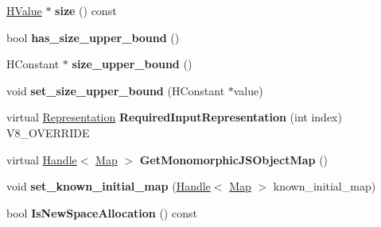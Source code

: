 \begin{DoxyCompactItemize}
\item 
\hypertarget{classv8_1_1internal_1_1_v8___f_i_n_a_l_a71e63fd05d13c130928b572c6955f1fd}{}\hyperlink{classv8_1_1internal_1_1_h_value}{H\+Value} $\ast$ {\bfseries size} () const \label{classv8_1_1internal_1_1_v8___f_i_n_a_l_a71e63fd05d13c130928b572c6955f1fd}

\item 
\hypertarget{classv8_1_1internal_1_1_v8___f_i_n_a_l_a988a0430d0c63125e30ded201e5c899c}{}bool {\bfseries has\+\_\+size\+\_\+upper\+\_\+bound} ()\label{classv8_1_1internal_1_1_v8___f_i_n_a_l_a988a0430d0c63125e30ded201e5c899c}

\item 
\hypertarget{classv8_1_1internal_1_1_v8___f_i_n_a_l_ac819ec6ceac822f5c24d97f917353579}{}H\+Constant $\ast$ {\bfseries size\+\_\+upper\+\_\+bound} ()\label{classv8_1_1internal_1_1_v8___f_i_n_a_l_ac819ec6ceac822f5c24d97f917353579}

\item 
\hypertarget{classv8_1_1internal_1_1_v8___f_i_n_a_l_a99be38d9c32a7a0cd36c136fad2b1885}{}void {\bfseries set\+\_\+size\+\_\+upper\+\_\+bound} (H\+Constant $\ast$value)\label{classv8_1_1internal_1_1_v8___f_i_n_a_l_a99be38d9c32a7a0cd36c136fad2b1885}

\item 
\hypertarget{classv8_1_1internal_1_1_v8___f_i_n_a_l_a6c6d1f37f40b113d8f4062f1ffff7215}{}virtual \hyperlink{classv8_1_1internal_1_1_representation}{Representation} {\bfseries Required\+Input\+Representation} (int index) V8\+\_\+\+O\+V\+E\+R\+R\+I\+D\+E\label{classv8_1_1internal_1_1_v8___f_i_n_a_l_a6c6d1f37f40b113d8f4062f1ffff7215}

\item 
\hypertarget{classv8_1_1internal_1_1_v8___f_i_n_a_l_a11de227696ca85f6a503c43204cfcec4}{}virtual \hyperlink{classv8_1_1internal_1_1_handle}{Handle}$<$ \hyperlink{classv8_1_1internal_1_1_map}{Map} $>$ {\bfseries Get\+Monomorphic\+J\+S\+Object\+Map} ()\label{classv8_1_1internal_1_1_v8___f_i_n_a_l_a11de227696ca85f6a503c43204cfcec4}

\item 
\hypertarget{classv8_1_1internal_1_1_v8___f_i_n_a_l_aaa05f1b5927e8951c08a8fbdb6ca2ad9}{}void {\bfseries set\+\_\+known\+\_\+initial\+\_\+map} (\hyperlink{classv8_1_1internal_1_1_handle}{Handle}$<$ \hyperlink{classv8_1_1internal_1_1_map}{Map} $>$ known\+\_\+initial\+\_\+map)\label{classv8_1_1internal_1_1_v8___f_i_n_a_l_aaa05f1b5927e8951c08a8fbdb6ca2ad9}

\item 
\hypertarget{classv8_1_1internal_1_1_v8___f_i_n_a_l_a120e76165b7ad28a53efabd9582ebbe1}{}bool {\bfseries Is\+New\+Space\+Allocation} () const \label{classv8_1_1internal_1_1_v8___f_i_n_a_l_a120e76165b7ad28a53efabd9582ebbe1}


\end{DoxyCompactItemize}

